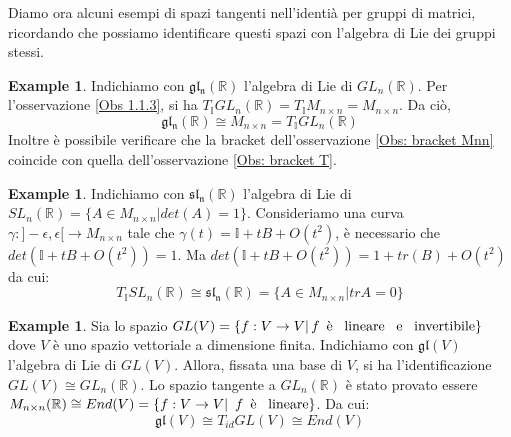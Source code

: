 \documentclass[12pt,a4paper]{report}
\theoremstyle{definition}
\theoremstyle{Theorem}
\theoremstyle{definition}
\newtheorem{Ex}[Def]{Example}
\theoremstyle{definition}
\begin{document}
		Diamo ora alcuni esempi di spazi tangenti nell'identià per gruppi di matrici, ricordando che possiamo identificare questi spazi con l'algebra di Lie dei gruppi stessi.
		\begin{Ex}
			Indichiamo con $\mathfrak{gl_n(\mathbb{R})}$ l'algebra di Lie di $GL_n(\mathbb{R})$.
			Per l'osservazione \ref{Obs 1.1.3}, si ha $T_\mathbb{I}GL_n(\mathbb{R})=T_\mathbb{I}M_{n\times n}=M_{n\times n}$. Da ciò, $$\mathfrak{gl_n(\mathbb{R})}\cong M_{n\times n}= T_\mathbb{I}GL_n(\mathbb{R})$$
			Inoltre è possibile verificare che la bracket dell'osservazione \ref{Obs: bracket Mnn} coincide con quella dell'osservazione \ref{Obs: bracket T}.
		\end{Ex}
		\begin{Ex}
			Indichiamo con $\mathfrak{sl_n(\mathbb{R})}$ l'algebra di Lie di $SL_n(\mathbb{R})=\{A\in M_{n\times n}|det(A)=1\}$.
			Consideriamo una curva $\gamma:]-\epsilon,\epsilon[\rightarrow M_{n\times n}$ tale che $\gamma(t)=\mathbb{I}+tB+O(t^2)$, è necessario che $det(\mathbb{I}+tB+O(t^2))=1$. Ma $det(\mathbb{I}+tB+O(t^2))=1+tr(B)+O(t^2)$ da cui: $$T_\mathbb{I}SL_n(\mathbb{R})\cong \mathfrak{sl_n(\mathbb{R})}=\{A\in M_{n\times n}|trA=0\}$$ 
		\end{Ex}
		\begin{Ex}
			Sia lo spazio $GL(V)=\{f:V\rightarrow V|\, \textnormal{$f$\,  è \, lineare \, e \, invertibile}\}$ dove $V$ è uno spazio vettoriale a dimensione finita. Indichiamo con $\mathfrak{gl}(V)$ l'algebra di Lie di $GL(V)$.  Allora, fissata una base di $V$, si ha l'identificazione $GL(V)\cong GL_n(\mathbb{R})$. Lo spazio tangente a $GL_n(\mathbb{R})$ è stato provato essere $M_{n\times n}(\mathbb{R})\cong End(V)=\{f:V\rightarrow V|\textnormal{\, $f$\, è \, lineare}\}$. Da cui: 
			$$\mathfrak{gl}(V)\cong T_{id}GL(V)\cong End(V)$$ 
		\end{Ex}
\end{document}
